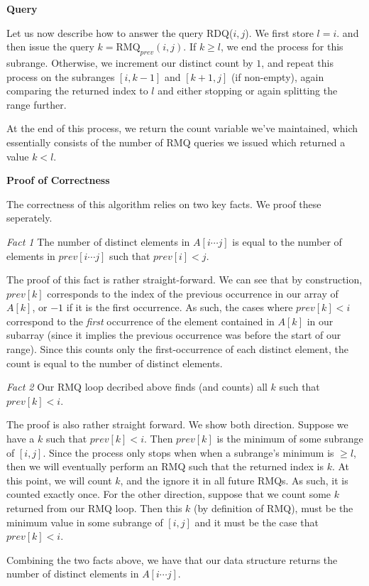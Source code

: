 \documentclass[12pt]{exam}
\begin{document}
\begin{questions}
\begin{solution}
\textbf{Query}

Let us now describe how to answer the query RDQ($i,j$). We first store $l = i$. and then issue the query $k = \text{RMQ}_{prev}(i,j)$. If $k \geq l$, we end the process for this subrange. Otherwise, we increment our distinct count by $1$, and repeat this process on the subranges $[i, k  - 1]$ and $[k+1, j]$ (if non-empty), again comparing the returned index to $l$ and either stopping or again splitting the range further.

At the end of this process, we return the count variable we've maintained, which essentially consists of the number of RMQ queries we issued which returned a value $k < l$.


\textbf{Proof of Correctness}

The correctness of this algorithm relies on two key facts. We proof these seperately.

\textit{Fact 1}
The number of distinct elements in $A[i \cdots j]$ is equal to the number of elements in $prev[i \cdots j]$ such that $prev[i] < j$.

The proof of this fact is rather straight-forward. We can see that by construction, $prev[k]$ corresponds to the index of the previous occurrence in our array of $A[k]$, or $-1$ if it is the first occurrence. As such, the cases where $prev[k] < i$ correspond to the \textit{first} occurrence of the element contained in $A[k]$ in our subarray (since it implies the previous occurrence was before the start of our range). Since this counts only the first-occurrence of each distinct element, the count is equal to the number of distinct elements.


\textit{Fact 2}
Our RMQ loop decribed above finds (and counts) all $k$ such that $prev[k] < i$. 

The proof is also rather straight forward. We show both direction. Suppose we have a $k$ such that $prev[k] < i$. Then $prev[k]$ is the minimum of some subrange of $[i,j]$. Since the process only stops when when a subrange's minimum is $\geq l$, then we will eventually perform an RMQ such that the returned index is $k$. At this point, we will count $k$, and the ignore it in all future RMQs. As such, it is counted exactly once. For the other direction, suppose that we count some $k$ returned from our RMQ loop. Then this $k$ (by definition of RMQ), must be the minimum value in some subrange of $[i,j]$ and it must be the case that $prev[k] < i$.


Combining the two facts above, we have that our data structure returns the number of distinct elements in $A[i \cdots j]$.




\end{solution}
\end{questions}
\end{document}
